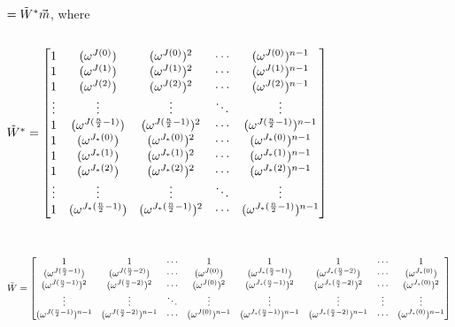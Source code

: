 $ $

$ = \tilde{W}^* \vec{m} $, where 

$ $

\noindent $\tilde{W}^* = \begin{bmatrix}
1 & (\omega^{J(0)}) & (\omega^{J(0)})^2 & \cdots & (\omega^{J(0)})^{n-1}\\
1 & (\omega^{J(1)}) & (\omega^{J(1)})^2 & \cdots & (\omega^{J(1)})^{n-1}\\
1 & (\omega^{J(2)}) & (\omega^{J(2)})^2 & \cdots & (\omega^{J(2)})^{n-1}\\
\vdots & \vdots & \vdots & \ddots & \vdots \\
1 & (\omega^{J(\frac{n}{2}-1)}) & (\omega^{J(\frac{n}{2}-1)})^2 & \cdots & (\omega^{J(\frac{n}{2}-1)})^{n-1}\\
1 & (\omega^{J_*(0)}) & (\omega^{J_*(0)})^2 & \cdots & (\omega^{J_*(0)})^{n-1}\\
1 & (\omega^{J_*(1)}) & (\omega^{J_*(1)})^2 & \cdots & (\omega^{J_*(1)})^{n-1}\\
1 & (\omega^{J_*(2)}) & (\omega^{J_*(2)})^2 & \cdots & (\omega^{J_*(2)})^{n-1}\\
\vdots & \vdots & \vdots & \ddots & \vdots \\
1 & (\omega^{J_*(\frac{n}{2}-1)}) & (\omega^{J_*(\frac{n}{2}-1)})^2 & \cdots & (\omega^{J_*(\frac{n}{2}-1)})^{n-1}\\
\end{bmatrix}$

$ $

$ $

\noindent $\tilde{W} = \begin{bmatrix}
1 & 1 & \cdots & 1 & 1 & 1 & \cdots & 1\\
(\omega^{J(\frac{n}{2} - 1)}) & (\omega^{J(\frac{n}{2} - 2)}) & \cdots & (\omega^{J(0)}) & (\omega^{J_*(\frac{n}{2} - 1)}) & (\omega^{J_*(\frac{n}{2} - 2)}) & \cdots & (\omega^{J_*(0)})\\
(\omega^{J(\frac{n}{2} - 1)})^2 & (\omega^{J(\frac{n}{2} - 2)})^2 & \cdots & (\omega^{J(0)})^2 & (\omega^{J_*(\frac{n}{2} - 1)})^2 & (\omega^{J_*(\frac{n}{2} - 2)})^2 & \cdots & (\omega^{J_*(0)})^2 \\
\vdots & \vdots & \ddots & \vdots & \vdots & \vdots & \vdots & \vdots \\
(\omega^{J(\frac{n}{2} - 1)})^{n-1} & (\omega^{J(\frac{n}{2} - 2)})^{n-1} & \cdots & (\omega^{J(0)})^{n-1} & (\omega^{J_*(\frac{n}{2} - 1)})^{n-1} & (\omega^{J_*(\frac{n}{2} - 2)})^{n-1} & \cdots  & (\omega^{J_*(0)})^{n-1}
\end{bmatrix}$

